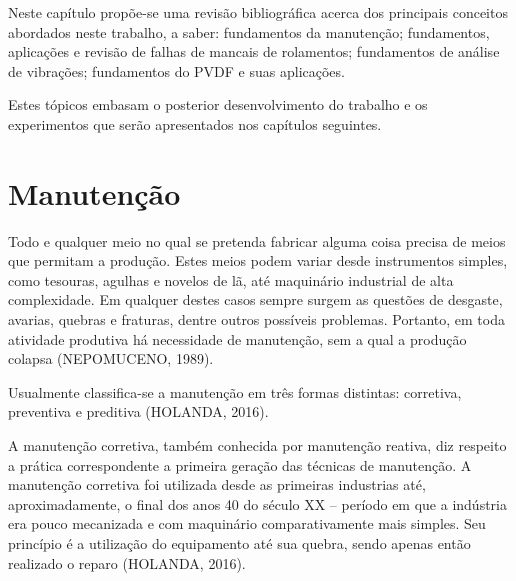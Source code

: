 \documentclass[
	12pt,				
	oneside,			
	a4paper,			
	english,			
	brazil,			
	]{abntex2ppgsi}
\begin{document}


Neste capítulo propõe-se uma revisão bibliográfica acerca dos principais conceitos abordados neste trabalho, a saber: fundamentos da manutenção; fundamentos, aplicações e revisão de falhas de mancais de rolamentos; fundamentos de análise de vibrações; fundamentos do PVDF e suas aplicações. 

Estes tópicos embasam o posterior desenvolvimento do trabalho e os experimentos que serão apresentados nos capítulos seguintes.

\section{\textbf{Manutenção}}
Todo e qualquer meio no qual se pretenda fabricar alguma coisa precisa de meios que permitam a produção. Estes meios podem variar desde instrumentos simples, como tesouras, agulhas e novelos de lã, até maquinário industrial de alta complexidade. Em qualquer destes casos sempre surgem as questões de desgaste, avarias, quebras e fraturas, dentre outros possíveis problemas. Portanto, em toda atividade produtiva  há necessidade de manutenção, sem a qual a produção colapsa (NEPOMUCENO, 1989).

	Usualmente classifica-se a manutenção em três formas distintas: corretiva, preventiva e preditiva (HOLANDA, 2016). 

	A manutenção corretiva, também conhecida por manutenção reativa, diz respeito a prática correspondente a primeira geração das técnicas de manutenção. A manutenção corretiva foi utilizada desde as primeiras industrias até, aproximadamente, o final dos anos 40 do século XX – período em que a indústria era pouco mecanizada e com maquinário comparativamente mais simples. Seu princípio é a utilização do equipamento até sua quebra, sendo apenas então realizado o reparo (HOLANDA, 2016). 
	
\end{document}
